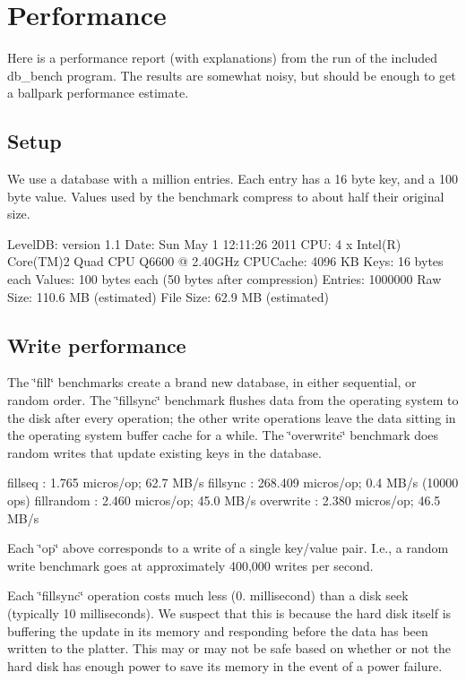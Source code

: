\section*{Performance}

Here is a performance report (with explanations) from the run of the included db\+\_\+bench program. The results are somewhat noisy, but should be enough to get a ballpark performance estimate.

\subsection*{Setup}

We use a database with a million entries. Each entry has a 16 byte key, and a 100 byte value. Values used by the benchmark compress to about half their original size. \begin{DoxyVerb}LevelDB:    version 1.1
Date:       Sun May  1 12:11:26 2011
CPU:        4 x Intel(R) Core(TM)2 Quad CPU    Q6600  @ 2.40GHz
CPUCache:   4096 KB
Keys:       16 bytes each
Values:     100 bytes each (50 bytes after compression)
Entries:    1000000
Raw Size:   110.6 MB (estimated)
File Size:  62.9 MB (estimated)
\end{DoxyVerb}


\subsection*{Write performance}

The \char`\"{}fill\char`\"{} benchmarks create a brand new database, in either sequential, or random order. The \char`\"{}fillsync\char`\"{} benchmark flushes data from the operating system to the disk after every operation; the other write operations leave the data sitting in the operating system buffer cache for a while. The \char`\"{}overwrite\char`\"{} benchmark does random writes that update existing keys in the database. \begin{DoxyVerb}fillseq      :       1.765 micros/op;   62.7 MB/s
fillsync     :     268.409 micros/op;    0.4 MB/s (10000 ops)
fillrandom   :       2.460 micros/op;   45.0 MB/s
overwrite    :       2.380 micros/op;   46.5 MB/s
\end{DoxyVerb}


Each \char`\"{}op\char`\"{} above corresponds to a write of a single key/value pair. I.\+e., a random write benchmark goes at approximately 400,000 writes per second.

Each \char`\"{}fillsync\char`\"{} operation costs much less (0. millisecond) than a disk seek (typically 10 milliseconds). We suspect that this is because the hard disk itself is buffering the update in its memory and responding before the data has been written to the platter. This may or may not be safe based on whether or not the hard disk has enough power to save its memory in the event of a power failure.

